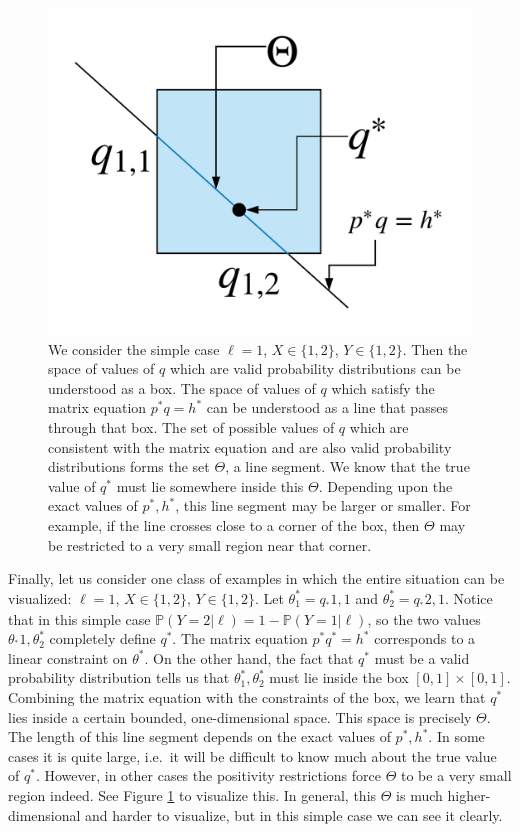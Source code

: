 \begin{figure}
\hfill{}\includegraphics[width=.7\textwidth]{../images/polytope}\hfill{}
\caption{We consider the simple case $\ell=1$, $X\in \{1,2\}$, $Y\in \{1,2\}$.  Then the space of values of $q$ which are valid probability distributions can be understood as a box.  The space of values of $q$ which satisfy the matrix equation $p^* q = h^*$ can be understood as a line that passes through that box.  The set of possible values of $q$ which are consistent with the matrix equation and are also valid probability distributions forms the set $\Theta$, a line segment.  We know that the true value of $q^*$ must lie somewhere inside this $\Theta$.  Depending upon the exact values of $p^*,h^*$, this line segment may be larger or smaller.  For example, if the line crosses close to a corner of the box, then $\Theta$ may be restricted to a very small region near that corner.  \label{fig:polytopeexample}}
\end{figure}

\begin{example}
Finally, let us consider one class of examples in which the entire situation can be visualized: $\ell=1$, $X\in \{1,2\}$, $Y\in \{1,2\}$.   Let $\theta^*_1 = q_^*{1,1}$ and $\theta^*_2 = q_^*{2,1}$.  Notice that in this simple case $\mathbb{P}(Y=2|\ell) = 1- \mathbb{P}(Y=1|\ell)$, so the two values $\theta_^*1,\theta_2^*$ completely define $q^*$.  The matrix equation $p^* q^* = h^*$ corresponds to a linear constraint on $\theta^*$.  On the other hand, the fact that $q^*$ must be a valid probability distribution tells us that $\theta_1^*,\theta_2^*$ must lie inside the box $[0,1]\times[0,1]$.   Combining the matrix equation with the constraints of the box, we learn that $q^*$ lies inside a certain bounded, one-dimensional space.  This space is precisely $\Theta$.  The length of this line segment depends on the exact values of $p^*,h^*$.  In some cases it is quite large, i.e.\ it will be difficult to know much about the true value of $q^*$.  However, in other cases the positivity restrictions force $\Theta$ to be a very small region indeed.  See Figure \ref{fig:polytopeexample} to visualize this.  In general, this $\Theta$ is much higher-dimensional and harder to visualize, but in this simple case we can see it clearly.
\end{example}  

